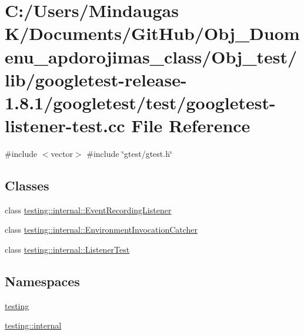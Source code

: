 \hypertarget{_obj__test_2lib_2googletest-release-1_88_81_2googletest_2test_2googletest-listener-test_8cc}{}\section{C\+:/\+Users/\+Mindaugas K/\+Documents/\+Git\+Hub/\+Obj\+\_\+\+Duomenu\+\_\+apdorojimas\+\_\+class/\+Obj\+\_\+test/lib/googletest-\/release-\/1.8.1/googletest/test/googletest-\/listener-\/test.cc File Reference}
\label{_obj__test_2lib_2googletest-release-1_88_81_2googletest_2test_2googletest-listener-test_8cc}
{\ttfamily \#include $<$vector$>$}\newline
{\ttfamily \#include \char`\"{}gtest/gtest.\+h\char`\"{}}\newline
\subsection*{Classes}
\begin{DoxyCompactItemize}
\item 
class \mbox{\hyperlink{classtesting_1_1internal_1_1_event_recording_listener}{testing\+::internal\+::\+Event\+Recording\+Listener}}
\item 
class \mbox{\hyperlink{classtesting_1_1internal_1_1_environment_invocation_catcher}{testing\+::internal\+::\+Environment\+Invocation\+Catcher}}
\item 
class \mbox{\hyperlink{classtesting_1_1internal_1_1_listener_test}{testing\+::internal\+::\+Listener\+Test}}
\end{DoxyCompactItemize}
\subsection*{Namespaces}
\begin{DoxyCompactItemize}
\item 
 \mbox{\hyperlink{namespacetesting}{testing}}
\item 
 \mbox{\hyperlink{namespacetesting_1_1internal}{testing\+::internal}}
\end{DoxyCompactItemize}

